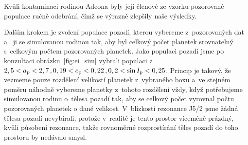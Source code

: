 \documentclass[A4paper, 12pt, oneside]{book}
\begin{document}
Kvůli kontaminaci rodinou Adeona byly její členové ze vzorku pozorované populace ručně odebrání, čímž se výrazně zlepšily naše výsledky. 

Dalším krokem je zvolení populace pozadí, kterou vybereme z~pozorovaných dat a~ ji se simulovanou rodinou tak, aby byl celkový počet planetek srovnatelný s~celkovým počtem pozorovaných planetek. Jako populaci pozadí jsme po konzultaci obrázku~\ref{fig:ei_sim} vybrali populaci z~$2,5 < a_{\rm p} < 2,7\,, 0,19 < e_{\rm p} < 0,22\,, 0,2 < \sin I_{\rm p} < 0,25$. Princip  je takový, že vezmeme pouze rozdělení velikostí planetek z~vybraného boxu a~ve stejném poměru náhodně vybereme planetky z~tohoto rozdělení vždy, když potřebujeme  simulovanou rodinu o~tělesa pozadí tak, aby se celkový počet vyrovnal počtu pozorovaných planetek o dané velikost. V~blízkosti rezonance J5/2 jsme žádná tělesa pozadí nevybírali, protože v~realitě je tento prostor víceméně prázdný, kvůli působení rezonance, takže rovnoměrné rozprostírání těles pozadí do toho prostoru by nedávalo smysl.
\end{document}

